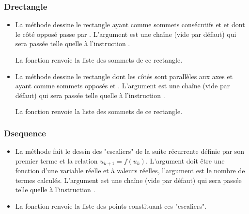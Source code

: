 \subsubsection{Drectangle}
\begin{itemize}
    \item La méthode  dessine le rectangle ayant comme sommets consécutifs  et  et dont le côté opposé passe par . L'argument  est une chaîne (vide par défaut) qui sera passée telle quelle à l'instruction \drawcmd. \par    
    La fonction  renvoie la liste des sommets de ce rectangle.
    
    \item La méthode  dessine le rectangle dont les côtés sont parallèles aux axes et ayant comme sommets opposés  et . L'argument  est une chaîne (vide par défaut) qui sera passée telle quelle à l'instruction \drawcmd. \par
    La fonction  renvoie la liste des sommets de ce rectangle.
\end{itemize}

\subsubsection{Dsequence}
\begin{itemize}
    \item La méthode  fait le dessin des "escaliers" de la suite récurrente définie par son premier terme  et la relation \(u_{k+1}=f(u_k)\). L'argument  doit être une fonction d'une variable réelle et à valeurs réelles, l'argument  est le nombre de termes calculés. L'argument  est une chaîne (vide par défaut) qui sera passée telle quelle à l'instruction \drawcmd.
    \item La fonction  renvoie la liste des points constituant ces "escaliers".
\end{itemize}

